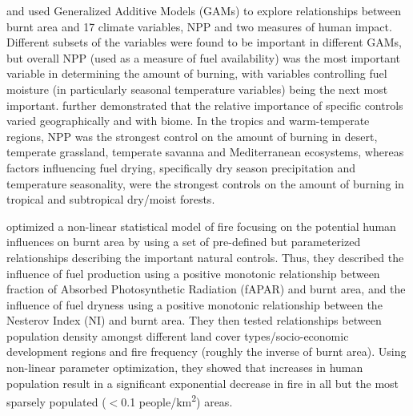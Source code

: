 \citet{krawchuk2009global} and \citet{moritz2012climate} used Generalized Additive Models (GAMs) to explore relationships between burnt area and 17 climate variables, NPP and two measures of human impact.
Different subsets of the variables were found to be important in different GAMs, but overall NPP (used as a measure of fuel availability) was the most important variable in determining the amount of burning, with variables controlling fuel moisture (in particularly seasonal temperature variables) being the next most important.
\citet{moritz2012climate} further demonstrated that the relative importance of specific controls varied geographically and with biome. In the tropics and warm-temperate regions, NPP was the strongest control on the amount of burning in desert, temperate grassland, temperate savanna and Mediterranean ecosystems, whereas factors influencing fuel drying, specifically dry season precipitation and temperature seasonality, were the strongest controls on the amount of burning in tropical and subtropical dry/moist forests.

\citet{knorr2014impact} optimized a non-linear statistical model of fire focusing on the potential human influences on burnt area by using a set of pre-defined but parameterized relationships describing the important natural controls. Thus, they described the influence of fuel production using a positive monotonic relationship between fraction of Absorbed Photosynthetic Radiation (fAPAR) and burnt area, and the influence of fuel dryness using a positive monotonic relationship between the Nesterov Index (NI) and burnt area.
They then tested relationships between population density amongst different land cover types/socio-economic development regions and fire frequency (roughly the inverse of burnt area).
Using non-linear parameter optimization, they showed that increases in human population result in a significant exponential decrease in fire in all but the most sparsely populated ($<$0.1 people/km\textsuperscript{2}) areas.

